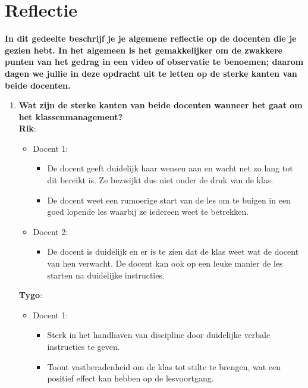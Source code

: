 \documentclass{article}
\begin{document}
    \section{Reflectie}
        \textbf{In dit gedeelte beschrijf je je algemene reflectie op de docenten die je gezien hebt. In het algemeen is het gemakkelijker om de zwakkere punten van het gedrag in een video of observatie te benoemen; daarom dagen we jullie in deze opdracht uit te letten op de sterke kanten van beide docenten.}
        \begin{enumerate}[label=(\alph*)]
            \item \textbf{Wat zijn de sterke kanten van beide docenten wanneer het gaat om het klassenmanagement?} \\
            \textbf {Rik}: 
                \begin{itemize}
                    \item Docent 1:
                        \begin{itemize}
                            \item De docent geeft duidelijk haar wensen aan en wacht net zo lang tot dit bereikt is. Ze bezwijkt dus niet onder de druk van de klas.
                            \item De docent weet een rumoerige start van de les om te buigen in een goed lopende les waarbij ze iedereen weet te betrekken.
                        \end{itemize}
                    \item Docent 2:
                        \begin{itemize}
                            \item De docent is duidelijk en er is te zien dat de klas weet wat de docent van hen verwacht. De docent kan ook op een leuke manier de les starten na duidelijke instructies.
                        \end{itemize}
                \end{itemize}
            \textbf{Tygo}: 
                \begin{itemize}
                    \item Docent 1:
                        \begin{itemize}
                            \item Sterk in het handhaven van discipline door duidelijke verbale instructies te geven.
                            \item Toont vastberadenheid om de klas tot stilte te brengen, wat een positief effect kan hebben op de lesvoortgang.

\end{itemize}
\end{itemize}
\end{enumerate}
\end{document}
